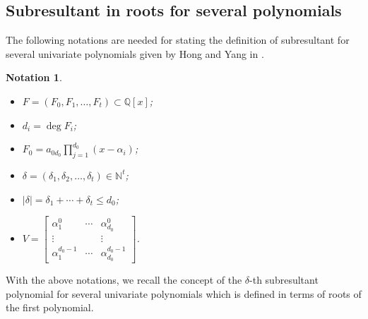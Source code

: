\documentclass{article}
\newtheorem{notation}[theorem]{Notation}
\begin{document}
\subsection{Subresultant in roots for several polynomials}
The following notations are needed for stating the definition of subresultant for several univariate polynomials given by Hong and Yang in \cite{hong2021subresultant}.
\begin{notation}\label{notation} \
\begin{itemize}
  \item $F = ({F_0},{F_1}, \ldots ,{F_t})\subset \mathbb{Q}[x]$;
  \item ${d_i} = \deg {F_{i}}$;
  \item ${F_0} =a_{0d_0}\prod_{j=1}^{d_0} (x-\alpha_i)$;
  \item
$\delta  = ({\delta _1},{\delta _2}, \ldots ,{\delta _t})\in \mathbb{N}^t$;
\item $\left| \delta  \right| = {\delta _1} +   \cdots  + {\delta _t} \le {d_0}$;

\item $V = \left[ {\begin{array}{*{20}{c}}
{\alpha _1^0}& \cdots &{\alpha _{{d_0}}^0}\\
 \vdots &{}& \vdots \\
{\alpha _1^{{d_0} - 1}}& \cdots &{\alpha _{d_0}^{{d_0} - 1}}
\end{array}} \right]$.
\end{itemize}
\end{notation}
With the above notations, we recall the concept of the $\delta$-th subresultant polynomial for several univariate polynomials which is defined in terms of roots of the first polynomial.
\end{document}
